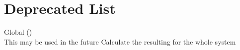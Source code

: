 \chapter{Deprecated List}
\hypertarget{deprecated}{}\label{deprecated}

\begin{DoxyRefList}
\item[Global \doxylink{classSystem_a039592b5c0ab1cbe2183990307348b66}{System\+::calculate\+DeltaQ} ()]\hfill \\
\label{deprecated__deprecated000001}%
%
This may be used in the future Calculate the resulting  for the whole system 
\end{DoxyRefList}
